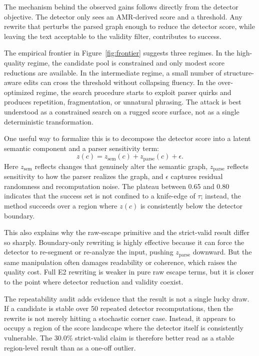 The mechanism behind the observed gains follows directly from the detector objective. The detector only sees an AMR-derived score and a threshold. Any rewrite that perturbs the parsed graph enough to reduce the detector score, while leaving the text acceptable to the validity filter, contributes to success.

The empirical frontier in Figure~\ref{fig:frontier} suggests three regimes. In the high-quality regime, the candidate pool is constrained and only modest score reductions are available. In the intermediate regime, a small number of structure-aware edits can cross the threshold without collapsing fluency. In the over-optimized regime, the search procedure starts to exploit parser quirks and produces repetition, fragmentation, or unnatural phrasing. The attack is best understood as a constrained search on a rugged score surface, not as a single deterministic transformation.

One useful way to formalize this is to decompose the detector score into a latent semantic component and a parser sensitivity term:
\[
z(c) = z_{\mathrm{sem}}(c) + z_{\mathrm{parse}}(c) + \epsilon.
\]
Here $z_{\mathrm{sem}}$ reflects changes that genuinely alter the semantic graph, $z_{\mathrm{parse}}$ reflects sensitivity to how the parser realizes the graph, and $\epsilon$ captures residual randomness and recomputation noise. The plateau between 0.65 and 0.80 indicates that the success set is not confined to a knife-edge of $\tau$; instead, the method succeeds over a region where $z(c)$ is consistently below the detector boundary.

This also explains why the raw-escape primitive and the strict-valid result differ so sharply. Boundary-only rewriting is highly effective because it can force the detector to re-segment or re-analyze the input, pushing $z_{\mathrm{parse}}$ downward. But the same manipulation often damages readability or coherence, which raises the quality cost. Full E2 rewriting is weaker in pure raw escape terms, but it is closer to the point where detector reduction and validity coexist.

The repeatability audit adds evidence that the result is not a single lucky draw. If a candidate is stable over 50 repeated detector recomputations, then the rewrite is not merely hitting a stochastic corner case. Instead, it appears to occupy a region of the score landscape where the detector itself is consistently vulnerable. The 30.0\% strict-valid claim is therefore better read as a stable region-level result than as a one-off outlier.

